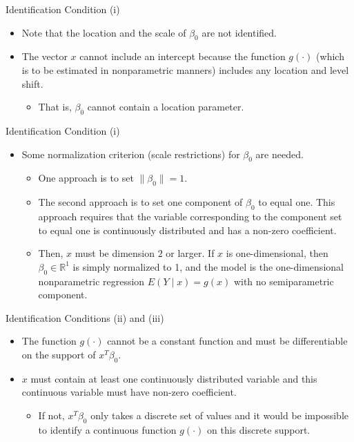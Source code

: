 \documentclass[xcolor=svgnames,dvipdfmx,cjk]{beamer}
\theoremstyle{example}
\begin{document}
\begin{frame}{Identification Condition (i)}
\begin{itemize}
  \item Note that \alert{the location and the scale of $\beta_0$ are not identified}.
  \item The vector $x$ cannot include an intercept 
        because the function $g(\cdot)$ (which is to be estimated in nonparametric manners) includes any location and level shift.
        \begin{itemize}
          \item That is, $\beta_0$ cannot contain a location parameter.
        \end{itemize}
\end{itemize}
\end{frame}

\begin{frame}{Identification Condition (i)}
  \begin{itemize}
    \item Some normalization criterion (scale restrictions) for $\beta_0$ are needed.
          \begin{itemize}
            \item One approach is to set $\| \beta_0 \| =1$.
            \item The second approach is to set one component of $\beta_0$ to equal one. 
                  This approach requires that 
                  the variable corresponding to the component set to equal one 
                  is continuously distributed 
                  and has a non-zero coefficient.
            \item Then, $x$ must be dimension $2$ or larger. 
                  If $x$ is one-dimensional, then $\beta_0 \in \mathbb{R}^1$ is simply normalized to 1, 
                  and the model is the one-dimensional nonparametric regression $E(Y \mid x) = g(x)$ with no semiparametric component.
          \end{itemize}
  \end{itemize}
  
\end{frame}

\begin{frame}{Identification Conditions (ii) and (iii)}
\begin{itemize}
  \item The function $g(\cdot)$ cannot be a constant function and must be differentiable on the support of $x^{T}\beta_0$.
  \item $x$ must contain at least one continuously distributed variable
        and this continuous variable must have non-zero coefficient.
        \begin{itemize}
          \item  If not, $x^{T} \beta_0$ only takes a discrete set of values and it would be impossible to identify a continuous function $g(\cdot)$ on this discrete support.
        \end{itemize}
\end{itemize}
\end{frame}
\end{document}
